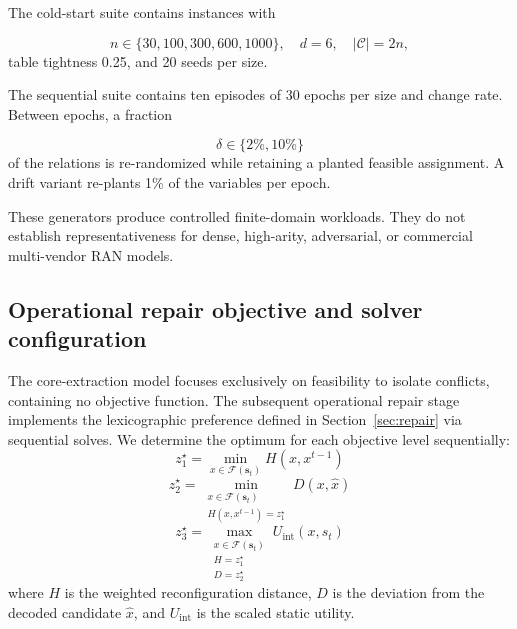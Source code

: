 \documentclass[pdflatex,sn-mathphys-num,iicol,oneside]{sn-jnl}
\begin{document}
The cold-start suite contains instances with

\[
n\in\{30,100,300,600,1000\},
\quad
d=6,
\quad
|\mathcal{C}|=2n,
\]
table tightness 0.25, and 20 seeds per size.

The sequential suite contains ten episodes of 30 epochs per size and
change rate. Between epochs, a fraction

\[
\delta\in\{2\%,10\%\}
\]
of the relations is re-randomized while retaining a planted feasible
assignment. A drift variant re-plants 1\% of the variables per epoch.

These generators produce controlled finite-domain workloads. They do
not establish representativeness for dense, high-arity, adversarial,
or commercial multi-vendor RAN models.

\subsection{Operational repair objective and solver configuration}

The core-extraction model focuses exclusively on feasibility to isolate conflicts, containing no objective function. The subsequent operational repair stage implements the lexicographic preference defined in Section~\ref{sec:repair} via sequential solves. We determine the optimum for each objective level sequentially:
\begin{equation}
z_1^\star = \min_{x \in \mathcal{F}(\bm{s}_t)} H(x, x^{t-1})
\end{equation}
\begin{equation}
z_2^\star = \min_{\substack{x \in \mathcal{F}(\bm{s}_t) \\ H(x, x^{t-1}) = z_1^\star}} D(x, \hat{x})
\end{equation}
\begin{equation}
z_3^\star = \max_{\substack{x \in \mathcal{F}(\bm{s}_t) \\ H = z_1^\star \\ D = z_2^\star}} U_{\mathrm{int}}(x, s_t)
\end{equation}
where $H$ is the weighted reconfiguration distance, $D$ is the deviation from the decoded candidate $\hat{x}$, and $U_{\mathrm{int}}$ is the scaled static utility. 
\end{document}
